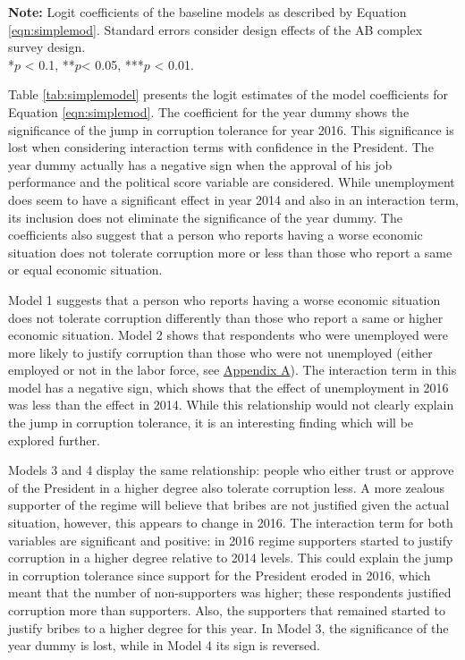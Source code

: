 \documentclass[12pt,a4]{article}
\begin{document}
\begin{table}[htbp]
\vspace{0.25cm}
\textbf{Note:} Logit coefficients of the baseline models as described by Equation \ref{eqn:simplemod}. Standard errors consider design effects of the AB complex survey design.\\
*$p$ < 0.1, **$p$< 0.05, ***$p$ < 0.01.
\end{table}

Table \ref{tab:simplemodel} presents the logit estimates of the model coefficients for Equation \ref{eqn:simplemod}. The coefficient for the year dummy shows the significance of the jump in corruption tolerance for year 2016. This significance is lost when considering interaction terms with confidence in the President. The year dummy actually has a negative sign when the approval of his job performance and the political score variable are considered. While unemployment does seem to have a significant effect in year 2014 and also in an interaction term, its inclusion does not eliminate the significance of the year dummy. The coefficients also suggest that a person who reports having a worse economic situation does not tolerate corruption more or less than those who report a same or equal economic situation. 

Model 1 suggests that a person who reports having a worse economic situation does not tolerate corruption differently than those who report a same or higher economic situation. Model 2 shows that respondents who were unemployed were more likely to justify corruption than those who were not unemployed (either employed or not in the labor force, see \hyperref[app:first]{Appendix A}). The interaction term in this model has a negative sign, which shows that the effect of unemployment in 2016 was less than the effect in 2014. While this relationship would not clearly explain the jump in corruption tolerance, it is an interesting finding which will be explored further. 

Models 3 and 4 display the same relationship: people who either trust or approve of the President in a higher degree also tolerate corruption less. A more zealous supporter of the regime will believe that bribes are not justified given the actual situation, however, this appears to change in 2016. The interaction term for both variables are significant and positive: in 2016 regime supporters started to justify corruption in a higher degree relative to 2014 levels. This could explain the jump in corruption tolerance since support for the President eroded in 2016, which meant that the number of non-supporters was higher; these respondents justified corruption more than supporters. Also, the supporters that remained started to justify bribes to a higher degree for this year. In Model 3, the significance of the year dummy is lost, while in Model 4 its sign is reversed.
\end{document}
